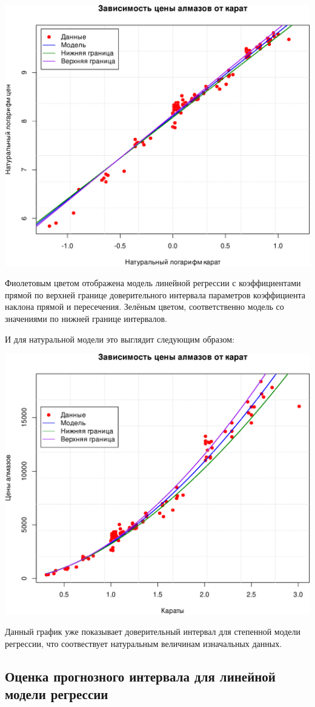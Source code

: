 \documentclass[
]{article}
\begin{document}
\begin{center}\includegraphics[width=0.6\linewidth]{Prac5_files/figure-latex/unnamed-chunk-20-1} \end{center}

Фиолетовым цветом отображена модель линейной регрессии с коэффициентами
прямой по верхней границе доверительного интервала параметров
коэффициента наклона прямой и пересечения. Зелёным цветом,
соответственно модель со значениями по нижней границе интервалов.

И для натуральной модели это выглядит следующим образом:

\begin{center}\includegraphics[width=0.6\linewidth]{Prac5_files/figure-latex/unnamed-chunk-21-1} \end{center}

Данный график уже показывает доверительный интервал для степенной модели
регрессии, что соотвествует натуральным величинам изначальных данных.

\hypertarget{ux43eux446ux435ux43dux43aux430-ux43fux440ux43eux433ux43dux43eux437ux43dux43eux433ux43e-ux438ux43dux442ux435ux440ux432ux430ux43bux430-ux434ux43bux44f-ux43bux438ux43dux435ux439ux43dux43eux439-ux43cux43eux434ux435ux43bux438-ux440ux435ux433ux440ux435ux441ux441ux438ux438}{%
\subsection{\texorpdfstring{\textbf{Оценка прогнозного интервала для
линейной модели
регрессии}}{Оценка прогнозного интервала для линейной модели регрессии}}\label{ux43eux446ux435ux43dux43aux430-ux43fux440ux43eux433ux43dux43eux437ux43dux43eux433ux43e-ux438ux43dux442ux435ux440ux432ux430ux43bux430-ux434ux43bux44f-ux43bux438ux43dux435ux439ux43dux43eux439-ux43cux43eux434ux435ux43bux438-ux440ux435ux433ux440ux435ux441ux441ux438ux438}}
\end{document}
